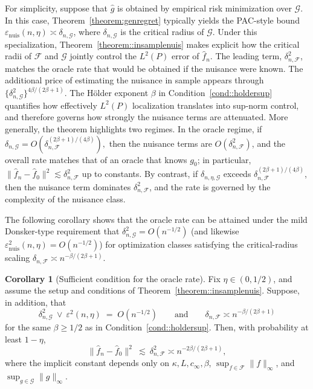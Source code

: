 \documentclass[11pt]{article}
\theoremstyle{plain}
\theoremstyle{definition} %
\newtheorem{corollary}{Corollary}
\begin{document}
For simplicity, suppose that \(\hat g\) is obtained by empirical risk
minimization over \(\mathcal G\). In this case,
Theorem~\ref{theorem:genregret} typically yields the PAC-style bound
\(\varepsilon_{\mathrm{nuis}}(n,\eta)\asymp \delta_{n,\mathcal G}\), where
\(\delta_{n,\mathcal G}\) is the critical radius of \(\mathcal G\). Under
this specialization, Theorem~\ref{theorem::insamplenuis} makes explicit how
the critical radii of \(\mathcal F\) and \(\mathcal G\) jointly control the
\(L^2(P)\) error of \(\hat f_n\). The leading term,
\(\delta_{n,\mathcal F}^2\), matches the oracle rate that would be obtained
if the nuisance were known. The additional price of estimating the nuisance
in sample appears through
\(\{\delta_{n,\mathcal G}^2\}^{4\beta/(2\beta+1)}\). The H\"older exponent \(\beta\) in Condition~\ref{cond::holdersup}
quantifies how effectively \(L^2(P)\) localization translates into sup-norm
control, and therefore governs how strongly the nuisance terms are
attenuated. More generally, the theorem highlights two regimes. In the oracle
regime, if $\delta_{n,\mathcal G}
= O(\delta_{n,\mathcal F}^{(2\beta+1)/(4\beta)}),$
then the nuisance terms are \(O(\delta_{n,\mathcal F}^2)\), and the overall
rate matches that of an oracle that knows \(g_0\); in particular,
\(\|\hat f_n-\hat f_0\|^2 \lesssim \delta_{n,\mathcal F}^2\) up to constants.
By contrast, if \(\delta_{n,\eta,\mathcal G}\) exceeds
\(\delta_{n,\mathcal F}^{(2\beta+1)/(4\beta)}\), then the nuisance term
dominates \(\delta_{n,\mathcal F}^2\), and the rate is governed by the
complexity of the nuisance class.

The following corollary shows that the oracle rate can be attained under the
mild Donsker-type requirement that \(\delta_{n,\mathcal G}^2=O(n^{-1/2})\)
(and likewise \(\varepsilon_{\mathrm{nuis}}^2(n,\eta)=O(n^{-1/2})\)) for
optimization classes satisfying the critical-radius scaling
\(\delta_{n,\mathcal F}\asymp n^{-\beta/(2\beta+1)}\).
\begin{corollary}[Sufficient condition for the oracle rate]
\label{cor::oracleeff}
Fix
\(\eta\in(0,1/2)\), and assume the setup and conditions of Theorem~\ref{theorem::insamplenuis}.  Suppose, in addition, that
\[
\delta_{n,\mathcal G}^2 \ \vee\ \varepsilon^2(n,\eta) 
\;=\;
O(n^{-1/2})
\qquad\text{and}\qquad
\delta_{n,\mathcal F}\asymp n^{-\beta/(2\beta+1)}
\]
for the same \(\beta \geq 1/2\) as in Condition~\ref{cond::holdersup}. Then, with
probability at least \(1-\eta\),
\[
\|\hat f_n-\hat f_0\|^2
\ \lesssim\
\delta_{n,\mathcal F}^2 \asymp n^{-2\beta/(2\beta+1)},
\]
where the implicit constant depends only on \(\kappa, L, c_{\infty}, \beta\),
\(\sup_{f\in\mathcal F}\|f\|_{\infty}\), and \(\sup_{g\in\mathcal G}\|g\|_{\infty}\).
\end{corollary}
\end{document}
